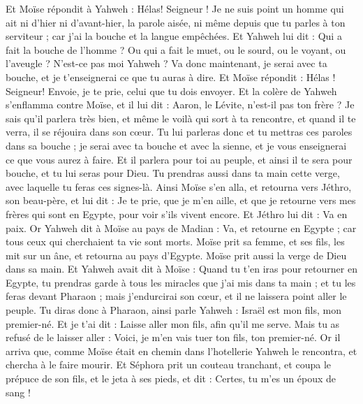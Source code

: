\begin{multicols}{2}
Et Moïse répondit à Yahweh : Hélas! Seigneur ! Je ne suis point un homme qui ait ni d'hier ni d’avant-hier, la parole aisée, ni même depuis que tu parles à ton serviteur ; car j'ai la bouche et la langue empêchées.
Et Yahweh lui dit : Qui a fait la bouche de l'homme ? Ou qui a fait le muet, ou le sourd, ou le voyant, ou l'aveugle ? N’est-ce pas moi Yahweh ?
Va donc maintenant, je serai avec ta bouche, et je t'enseignerai ce que tu auras à dire.
Et Moïse répondit : Hélas ! Seigneur! Envoie, je te prie, celui que tu dois envoyer.
Et la colère de Yahweh s’enflamma contre Moïse, et il lui dit : Aaron, le Lévite, n'est-il pas ton frère ? Je sais qu'il parlera très bien, et même le voilà qui sort à ta rencontre, et quand il te verra, il se réjouira dans son cœur.
Tu lui parleras donc et tu mettras ces paroles dans sa bouche ; je serai avec ta bouche et avec la sienne, et je vous enseignerai ce que vous aurez à faire.
Et il parlera pour toi au peuple, et ainsi il te sera pour bouche, et tu lui seras pour Dieu.
Tu prendras aussi dans ta main cette verge, avec laquelle tu feras ces signes-là.
Ainsi Moïse s'en alla, et retourna vers Jéthro, son beau-père, et lui dit : Je te prie, que je m'en aille, et que je retourne vers mes frères qui sont en Egypte, pour voir s'ils vivent encore. Et Jéthro lui dit : Va en paix.
Or Yahweh dit à Moïse au pays de Madian : Va, et retourne en Egypte ; car tous ceux qui cherchaient ta vie sont morts.
Moïse prit sa femme, et ses fils, les mit sur un âne, et retourna au pays d'Egypte. Moïse prit aussi la verge de Dieu dans sa main.
Et Yahweh avait dit à Moïse : Quand tu t'en iras pour retourner en Egypte, tu prendras garde à tous les miracles que j'ai mis dans ta main ; et tu les feras devant Pharaon ; mais j'endurcirai son cœur, et il ne laissera point aller le peuple.
Tu diras donc à Pharaon, ainsi parle Yahweh : Israël est mon fils, mon premier-né.
Et je t'ai dit : Laisse aller mon fils, afin qu'il me serve. Mais tu as refusé de le laisser aller : Voici, je m'en vais tuer ton fils, ton premier-né.
Or il arriva que, comme Moïse était en chemin dans l'hotellerie Yahweh le rencontra, et chercha à le faire mourir.
Et Séphora prit un couteau tranchant, et coupa le prépuce de son fils, et le jeta à ses pieds, et dit : Certes, tu m'es un époux de sang !

\end{multicols}
